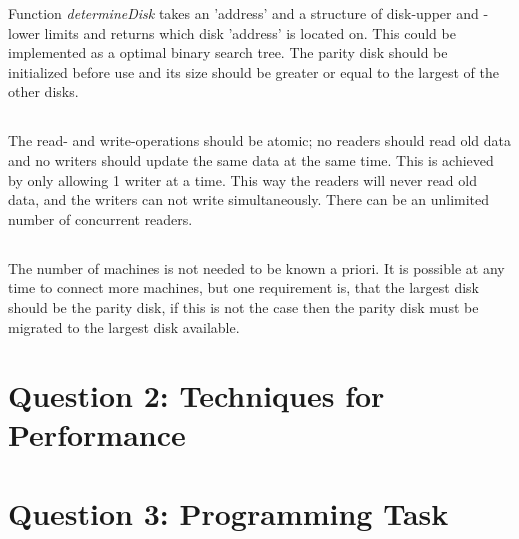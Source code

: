 \documentclass[12pt]{article}
\begin{document}
Function \emph{determineDisk} takes an 'address' and a structure of disk-upper and -lower limits and returns which disk 'address' is located on. This could be implemented as a optimal binary search tree. The parity disk should be initialized before use and its size should be greater or equal to the largest of the other disks.

\subsection{} %
The read- and write-operations should be atomic; no readers should read old data and no writers should update the same data at the same time.
This is achieved by only allowing 1 writer at a time. This way the readers will never read old data, and the writers can not write simultaneously. There can be an unlimited number of concurrent readers.

\subsection{} %
The number of machines is not needed to be known a priori. It is possible at any time to connect more machines, but one requirement is, that the largest disk should be the parity disk, if this is not the case then the parity disk must be migrated to the largest disk available.

\section{Question 2: Techniques for Performance}
\subsection{} %
\subsection{} %
\subsection{} %

\section{Question 3: Programming Task}
\end{document}
